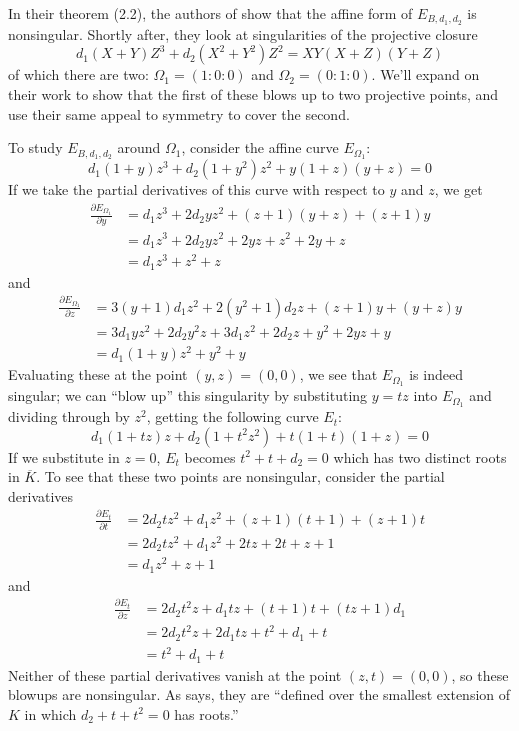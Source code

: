 In their theorem (2.2), the authors of \cite{bernstein2008binary} show that
    the affine form of $E_{B, d_1, d_2}$ is nonsingular.
Shortly after, they look at singularities of the projective closure
\[
d_1(X + Y)Z^3 + d_2(X^2 + Y^2)Z^2 = XY(X + Z)(Y + Z)
\]
    of which there are two: $\Omega_1 = (1 : 0 : 0)$ and $\Omega_2 = (0 : 1 :
    0)$.
We'll expand on their work to show that the first of these blows up to two
    projective points, and use their same appeal to symmetry to cover the
    second.

To study $E_{B, d_1, d_2}$ around $\Omega_1$, consider the affine curve
    $E_{\Omega_1}$:
\[
d_1(1 + y)z^3 + d_2(1 + y^2)z^2 + y(1 + z)(y + z) = 0
\]
If we take the partial derivatives of this curve with respect to $y$ and $z$,
    we get
\begin{align*}
\frac{\partial E_{\Omega_1}}{\partial y}
    &=  d_1z^3 + 2d_2yz^2 + (z + 1)(y + z) + (z + 1)y\\
    &=  d_1z^3 + 2d_2yz^2 + 2yz + z^2 + 2y + z\\
    &=  d_1z^3 + z^2 + z
\end{align*}
    and
\begin{align*}
\frac{\partial E_{\Omega_1}}{\partial z}
    &=  3(y + 1)d_1z^2 + 2(y^2 + 1)d_2z + (z + 1)y + (y + z)y\\
    &=  3d_1yz^2 + 2d_2y^2z + 3d_1z^2 + 2d_2z + y^2 + 2yz + y\\
    &=  d_1(1 + y)z^2 + y^2 + y
\end{align*}
Evaluating these at the point $(y, z) = (0, 0)$, we see that $E_{\Omega_1}$ is
    indeed singular; we can ``blow up'' this singularity by substituting $y =
    tz$ into $E_{\Omega_1}$ and dividing through by $z^2$, getting the
    following curve $E_t$:
\[
d_1(1 + tz)z + d_2(1 + t^2z^2) + t(1 + t)(1 + z) = 0
\]
If we substitute in $z = 0$, $E_t$ becomes $t^2 + t + d_2 = 0$ which has two
    distinct roots in $\overline{K}$.
To see that these two points are nonsingular, consider the partial derivatives
\begin{align*}
\frac{\partial E_t}{\partial t}
    &=  2d_2tz^2 + d_1z^2 + (z + 1)(t + 1) + (z + 1)t\\
    &=  2d_2tz^2 + d_1z^2 + 2tz + 2t + z + 1\\
    &=  d_1z^2 + z + 1
\end{align*}
    and
\begin{align*}
\frac{\partial E_t}{\partial z}
    &=  2d_2t^2z + d_1tz + (t + 1)t + (tz + 1)d_1\\
    &=  2d_2t^2z + 2d_1tz + t^2 + d_1 + t\\
    &=  t^2 + d_1 + t
\end{align*}
Neither of these partial derivatives vanish at the point $(z, t) = (0, 0)$, so
    these blowups are nonsingular.
As \cite{bernstein2008binary} says, they are ``defined over the smallest
    extension of $K$ in which $d_2 + t + t^2 = 0$ has roots.''


